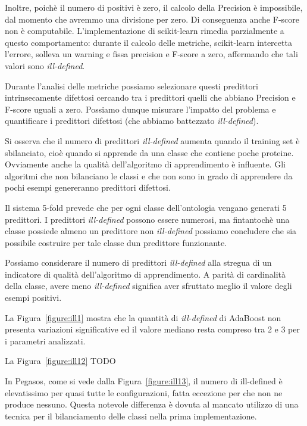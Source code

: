 \documentclass[12pt,a4paper,oneside,hidelinks]{report}
\begin{document}
Inoltre, poichè il numero di positivi è zero, il calcolo della Precision è impossibile, dal momento che avremmo una divisione per zero. Di conseguenza anche F-score non è computabile. L'implementazione di scikit-learn rimedia parzialmente a questo comportamento: durante il calcolo delle metriche, scikit-learn intercetta l'errore, solleva un warning e fissa precision e F-score a zero, affermando che tali valori sono \emph{ill-defined}.

Durante l'analisi delle metriche possiamo selezionare questi predittori intrinsecamente difettosi cercando tra i predittori quelli che abbiano Precision e F-score uguali a zero. Possiamo dunque misurare l'impatto del problema e quantificare i predittori difettosi (che abbiamo battezzato  \emph{ill-defined}).

Si osserva che il numero di predittori \emph{ill-defined} aumenta quando il training set è sbilanciato, cioè quando si apprende da una classe che contiene poche proteine. Ovviamente anche la qualità dell'algoritmo di apprendimento è influente. Gli algoritmi che non bilanciano le classi e che non sono in grado di apprendere da pochi esempi genereranno predittori difettosi.

Il sistema 5-fold prevede che per ogni classe dell'ontologia vengano generati 5 predittori. I predittori \emph{ill-defined} possono essere numerosi, ma fintantochè una classe possiede almeno un predittore non \emph{ill-defined} possiamo concludere che sia possibile costruire per tale classe dun predittore funzionante.

Possiamo considerare il numero di predittori \emph{ill-defined} alla stregua di un indicatore di qualità dell'algoritmo di apprendimento. A parità di cardinalità della classe, avere meno \emph{ill-defined} significa aver sfruttato meglio il valore degli esempi positivi.

La Figura~\ref{figure:ill1} mostra che la quantità di \emph{ill-defined} di AdaBoost non presenta variazioni significative ed il valore mediano resta compreso tra 2 e 3 per i parametri analizzati.

La Figura~\ref{figure:ill12} TODO

In Pegasos, come si vede dalla Figura~\ref{figure:ill13}, il numero di ill-defined è elevatissimo per quasi tutte le configurazioni, fatta eccezione per  che non ne produce nessuno. Questa notevole differenza è dovuta al mancato utilizzo di una tecnica per il bilanciamento delle classi nella prima implementazione.
\end{document}
